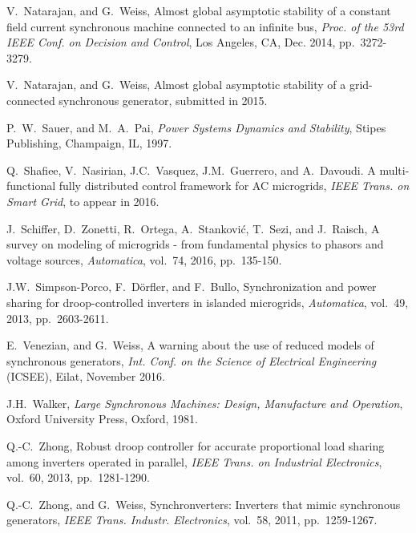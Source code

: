\documentclass{ifacconf}
\newcommand{\m}      {{\hbox{\hskip 1pt}}}
\begin{document}
\begin{thebibliography}{99}
 V.~Natarajan, and 
 G.~Weiss, \m Almost global asymptotic stability of a constant 
 field current synchronous machine connected to an infinite bus, 
 {\em Proc. of the 53rd IEEE Conf. on Decision and Control}, Los 
 Angeles, CA, Dec. 2014, pp.~3272-3279.

 V.~Natarajan, and 
 G.~Weiss, \m Almost global asymptotic stability of a 
 grid-connected synchronous generator, submitted in 2015.

 P.~W.~Sauer, and 
 M.~A.~Pai, \m {\em Power Systems Dynamics and Stability}, 
 Stipes Publishing, Champaign, IL, 1997.
  
 Q.~Shafiee, 
 V.~Nasirian, J.C.~Vasquez, J.M.~Guerrero, and A.~Davoudi. \m 
 A multi-functional fully distributed control framework for AC 
 microgrids, {\em IEEE Trans. on Smart Grid}, to appear in 2016.

 J.~Schiffer, 
 D.~Zonetti, R.~Ortega, A.~Stankovi{\'c}, T.~Sezi, and J.~Raisch, 
 \m A survey on modeling of microgrids - from fundamental physics to
 phasors and voltage sources, {\em Automatica}, vol.~74, 2016, pp.~135-150.

 J.W.~Simpson-Porco,
 F.~D{\"o}rfler, and F.~Bullo, \m Synchronization and power sharing 
 for droop-controlled inverters in islanded microgrids, 
 {\em Automatica}, vol.~49, 2013, pp.~2603-2611.

 E.~Venezian, and G.~Weiss,
 \m A warning about the use of reduced models of synchronous 
 generators, \m {\em Int. Conf. on the Science of Electrical 
 Engineering} (ICSEE), Eilat, November 2016.

 J.H.~Walker, \m {\em Large 
 Synchronous Machines: Design, Manufacture and Operation}, \m Oxford 
 University Press, Oxford, 1981.

 Q.-C.~Zhong, \m Robust droop 
 controller for accurate proportional load sharing among inverters 
 operated in parallel, {\em IEEE Trans. on Industrial Electronics}, 
 vol.~60, 2013, pp.~1281-1290.

 Q.-C.~Zhong, and G.~Weiss, \m 
 Synchronverters: Inverters that mimic synchronous generators, {\em 
 IEEE Trans. Industr. Electronics}, vol.~58, 2011, pp.~1259-1267.

\end{thebibliography}
\end{document}
